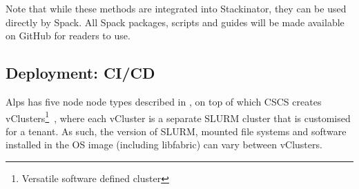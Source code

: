 Note that while these methods are integrated into Stackinator, they can be used directly by Spack. All Spack packages, scripts and guides will be made available on GitHub for readers to use.

\subsection{Deployment: CI/CD}

Alps has five node node types described in , on top of which CSCS creates vClusters\footnote{Versatile software defined cluster}~\cite{vClusters2023}, where each vCluster is a separate SLURM cluster that is customised for a tenant.
As such, the version of SLURM, mounted file systems and software installed in the OS image (including libfabric) can vary between vClusters.

